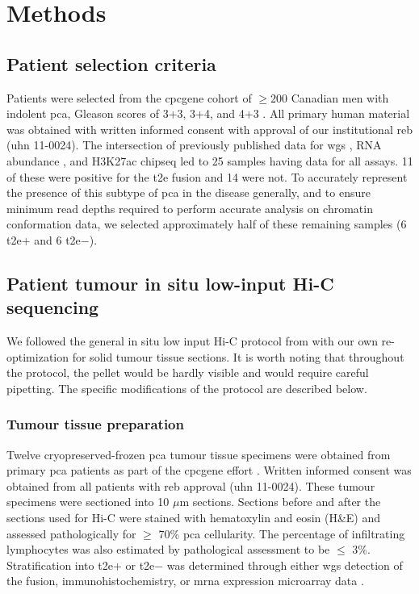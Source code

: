 \section{Methods}
\label{sec:3D_methods}

\subsection{Patient selection criteria}

Patients were selected from the \gls{cpcgene} cohort of $\ge 200$ Canadian men with indolent \gls{pca}, Gleason scores of 3+3, 3+4, and 4+3 \cite{fraserGenomicHallmarksLocalized2017}.
All primary human material was obtained with written informed consent with approval of our institutional \gls{reb} (\gls{uhn} 11-0024).
The intersection of previously published data for \gls{wgs} \cite{fraserGenomicHallmarksLocalized2017}, RNA abundance \cite{chenWidespreadFunctionalRNA2019}, and H3K27ac \gls{chipseq} \cite{kronTMPRSS2ERGFusion2017} led to 25 samples having data for all assays.
11 of these were positive for the \gls{t2e} fusion and 14 were not.
To accurately represent the presence of this subtype of \gls{pca} in the disease generally, and to ensure minimum read depths required to perform accurate analysis on chromatin conformation data, we selected approximately half of these remaining samples (6 \gls{t2e}+ and 6 \gls{t2e}$-$).

\subsection{Patient tumour in situ low-input Hi-C sequencing}

We followed the general in situ low input Hi-C protocol from \cite[REF][]{diazChromatinConformationAnalysis2018} with our own re-optimization for solid tumour tissue sections.
It is worth noting that throughout the protocol, the pellet would be hardly visible and would require careful pipetting.
The specific modifications of the protocol are described below.

\subsubsection{Tumour tissue preparation}

Twelve cryopreserved-frozen \gls{pca} tumour tissue specimens were obtained from primary \gls{pca} patients as part of the \gls{cpcgene} effort \cite{fraserGenomicHallmarksLocalized2017}.
Written informed consent was obtained from all patients with \gls{reb} approval (\gls{uhn} 11-0024).
These tumour specimens were sectioned into 10 $\mu$m sections.
Sections before and after the sections used for Hi-C were stained with hematoxylin and eosin (H\&E) and assessed pathologically for $\ge$ 70\% \gls{pca} cellularity.
The percentage of infiltrating lymphocytes was also estimated by pathological assessment to be $\le$ 3\%.
Stratification into \gls{t2e}+ or \gls{t2e}$-$ was determined through either \gls{wgs} detection of the fusion, immunohistochemistry, or \gls{mrna} expression microarray data \cite{fraserGenomicHallmarksLocalized2017}.

